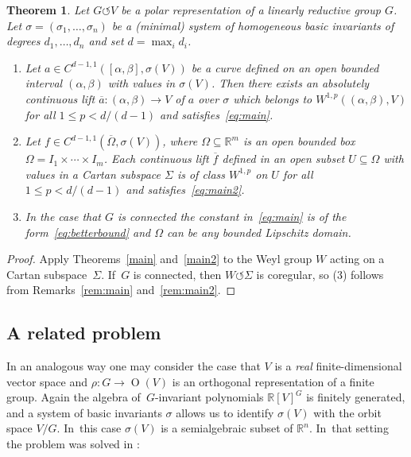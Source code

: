 \documentclass[pdftex]{sigma}
\numberwithin{equation}{section}
\newtheorem{Theorem}{Theorem}[section]
\def\al{\alpha}
\def\be{\beta}
\def\rh{\rho}
\def\si{\sigma}
\def\Si{\Sigma}
\def\Om{\Omega}
\def\R{\mathbb{R}}
\def\ol{\overline}
\def\acts{\circlearrowleft}
\let\on=\operatorname
\begin{document}
\begin{Theorem}
	Let $G \acts V$ be a polar representation of a linearly reductive group $G$.
	Let $\si=(\si_1,\dots,\si_n)$ be a (minimal) system of homogeneous
 basic invariants of degrees $d_1,\dots,d_n$ and set $d = \max_i d_i$.
\begin{enumerate}\itemsep=0pt
 	\item[$1.$] Let $a \in C^{d-1,1}([\al,\be],\si(V))$ be a curve
 defined on an open bounded interval
 $(\al,\be)$ with values in $\si(V)$. Then there exists an absolutely continuous lift $\ol a \colon (\al,\be) \to V$ of $a$
 over $\si$ which belongs to $W^{1,p}((\al,\be),V)$ for all $1 \le p <d/(d-1)$ and satisfies~\eqref{eq:main}.
 	\item[$2.$] Let $f \in C^{d-1,1}(\ol \Om,\si(V))$,
	where $\Om \subseteq \R^m$ is an open bounded box $\Om = I_1 \times \cdots \times I_m$.
	Each continuous lift $\ol f$ defined in an open subset $U\subseteq \Om$ with values in a Cartan subspace $\Si$
	is of class $W^{1,p}$ on $U$ for all $1 \le p <d/(d-1)$ and satisfies~\eqref{eq:main2}.
	\item[$3.$] In the case that $G$ is connected the constant in~\eqref{eq:main} is of the form~\eqref{eq:betterbound}
	and $\Om$ can be any bounded Lipschitz domain.
 \end{enumerate}
\end{Theorem}

\begin{proof}	Apply Theorems~\ref{main} and~\ref{main2} to the Weyl group $W$ acting on a Cartan sub\-space~$\Si$.
	If~$G$ is connected, then $W \acts \Si$ is coregular, so (3) follows from Remarks~\ref{rem:main} and~\ref{rem:main2}.
\end{proof}

\subsection{A related problem}

In an analogous way one may consider the case that $V$ is a \emph{real} finite-dimensional vector space
and $\rh \colon G \to \on{O}(V)$ is an orthogonal representation of a finite group.
Again the algebra of~$G$-invariant polynomials $\R[V]^G$ is finitely generated, and a system of basic invariants $\si$ allows us to
identify $\si(V)$ with the orbit space $V/G$. In~this case $\si(V)$ is a semialgebraic subset of $\R^n$. In~that setting the problem
was solved in \cite{ParusinskiRainer14}:
\end{document}
